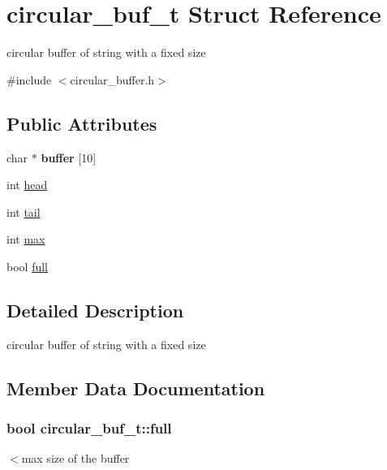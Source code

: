 \hypertarget{structcircular__buf__t}{}\section{circular\+\_\+buf\+\_\+t Struct Reference}
\label{structcircular__buf__t}


circular buffer of string with a fixed size  




{\ttfamily \#include $<$circular\+\_\+buffer.\+h$>$}

\subsection*{Public Attributes}
\begin{DoxyCompactItemize}
\item 
char $\ast$ {\bfseries buffer} \mbox{[}10\mbox{]}\hypertarget{structcircular__buf__t_aa6fc622a0093ef1dc9cf6d44aacc7e21}{}\label{structcircular__buf__t_aa6fc622a0093ef1dc9cf6d44aacc7e21}

\item 
int \hyperlink{structcircular__buf__t_afcc2394470aaf8e2fdc5d98e6f8dabb3}{head}
\item 
int \hyperlink{structcircular__buf__t_a3edb87c2175ecb1e23b948a4d1145f52}{tail}
\item 
int \hyperlink{structcircular__buf__t_adaaa093830fc4b55984d7758f4a50450}{max}
\item 
bool \hyperlink{structcircular__buf__t_ab0c0a41b6b9625c3f4f64d8703b3873c}{full}
\end{DoxyCompactItemize}


\subsection{Detailed Description}
circular buffer of string with a fixed size 

\subsection{Member Data Documentation}
\subsubsection[{\texorpdfstring{full}{full}}]{\setlength{\rightskip}{0pt plus 5cm}bool circular\+\_\+buf\+\_\+t\+::full}\hypertarget{structcircular__buf__t_ab0c0a41b6b9625c3f4f64d8703b3873c}{}\label{structcircular__buf__t_ab0c0a41b6b9625c3f4f64d8703b3873c}
$<$max size of the buffer 
